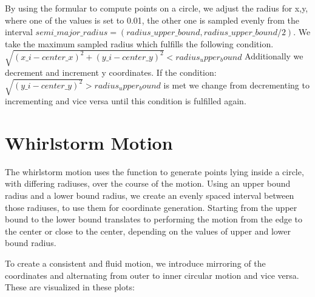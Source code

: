 By using the formular to compute points on a circle, we adjust the radius for 
x,y, where one of the values is set to 0.01, the other one is sampled evenly from the interval $semi\_major\_radius = (radius\_upper\_bound,radius\_upper\_bound / 2 ).$
We take the maximum sampled radius which fulfills the following condition. 
$\sqrt{(x\_{i} - center\_x)^2 + (y\_{i} - center\_y)^2} < radius_upper_bound$
Additionally we decrement and increment y coordinates. If the condition: $\sqrt{(y\_{i} - center\_y)^2} > radius_upper_bound$
is met we change from decrementing to incrementing and vice versa until this condition is fulfilled again.

\section{Whirlstorm Motion}
The whirlstorm motion uses the function to generate points lying inside a circle, with differing radiuses, over the course of the motion. 
Using an upper bound radius and a lower bound radius, we create an evenly spaced interval between those radiuses, to use them for coordinate generation. 
Starting from the upper bound to the lower bound translates to performing the motion from the edge to the center or close to the center, depending on the 
values of upper and lower bound radius. 

To create a consistent and fluid motion, we introduce mirroring of the coordinates and alternating from outer to inner circular motion and vice versa.
These are visualized in these plots:


